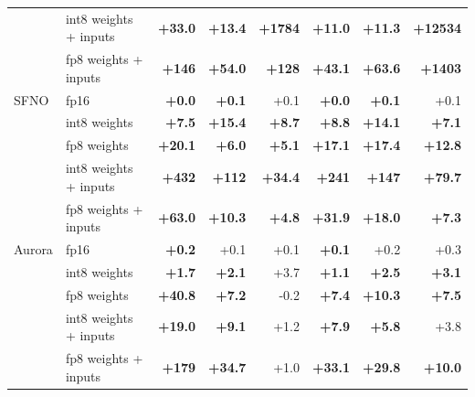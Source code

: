 \begin{table}[tbp]
\begin{tabular}{llrrrrrr}
 & int8 weights + inputs & \textbf{+33.0} & \textbf{+13.4} & \textbf{+1784} & \textbf{+11.0} & \textbf{+11.3} & \textbf{+12534} \\
 & fp8 weights + inputs & \textbf{+146} & \textbf{+54.0} & \textbf{+128} & \textbf{+43.1} & \textbf{+63.6} & \textbf{+1403} \\
\midrule
SFNO & fp16 & \textbf{+0.0} & \textbf{+0.1} & +0.1 & \textbf{+0.0} & \textbf{+0.1} & +0.1 \\
 & int8 weights & \textbf{+7.5} & \textbf{+15.4} & \textbf{+8.7} & \textbf{+8.8} & \textbf{+14.1} & \textbf{+7.1} \\
 & fp8 weights & \textbf{+20.1} & \textbf{+6.0} & \textbf{+5.1} & \textbf{+17.1} & \textbf{+17.4} & \textbf{+12.8} \\
 & int8 weights + inputs & \textbf{+432} & \textbf{+112} & \textbf{+34.4} & \textbf{+241} & \textbf{+147} & \textbf{+79.7} \\
 & fp8 weights + inputs & \textbf{+63.0} & \textbf{+10.3} & \textbf{+4.8} & \textbf{+31.9} & \textbf{+18.0} & \textbf{+7.3} \\
\midrule
Aurora & fp16 & \textbf{+0.2} & +0.1 & +0.1 & \textbf{+0.1} & +0.2 & +0.3 \\
 & int8 weights & \textbf{+1.7} & \textbf{+2.1} & +3.7 & \textbf{+1.1} & \textbf{+2.5} & \textbf{+3.1} \\
 & fp8 weights & \textbf{+40.8} & \textbf{+7.2} & -0.2 & \textbf{+7.4} & \textbf{+10.3} & \textbf{+7.5} \\
 & int8 weights + inputs & \textbf{+19.0} & \textbf{+9.1} & +1.2 & \textbf{+7.9} & \textbf{+5.8} & +3.8 \\
 & fp8 weights + inputs & \textbf{+179} & \textbf{+34.7} & +1.0 & \textbf{+33.1} & \textbf{+29.8} & \textbf{+10.0} \\
\bottomrule
\end{tabular}
\end{table}
